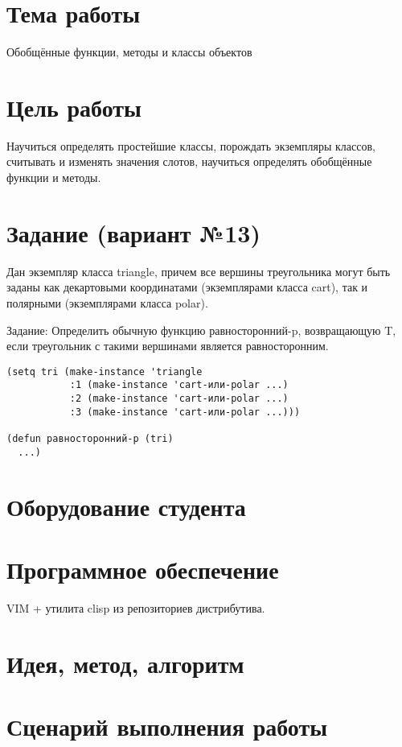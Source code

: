 \documentclass[12pt]{article}
\begin{document}

\section{Тема работы}
Обобщённые функции, методы и классы объектов

\section{Цель работы}
Научиться определять простейшие классы, порождать экземпляры классов,
считывать и изменять значения слотов, научиться определять обобщённые
функции и методы.

\section{Задание (вариант №13)}
\noindent
Дан экземпляр класса triangle, причем все вершины треугольника могут
быть заданы как декартовыми координатами (экземплярами класса cart),
так и полярными (экземплярами класса polar).

Задание: Определить обычную функцию равносторонний-p, возвращающую T,
если треугольник с такими вершинами является равносторонним.

\begin{lstlisting}
(setq tri (make-instance 'triangle
           :1 (make-instance 'cart-или-polar ...)
           :2 (make-instance 'cart-или-polar ...)
           :3 (make-instance 'cart-или-polar ...)))

(defun равносторонний-p (tri)
  ...)
\end{lstlisting}

\section{Оборудование студента}
\mypc

\section{Программное обеспечение}
VIM + утилита clisp из репозиториев дистрибутива.

\section{Идея, метод, алгоритм}
\section{Сценарий выполнения работы}
\end{document}
